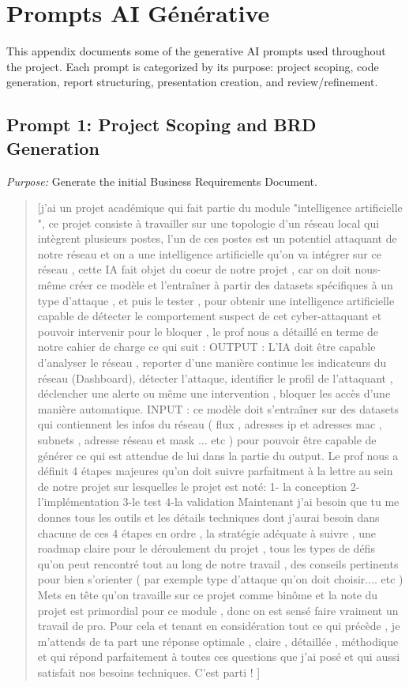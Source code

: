 \documentclass[12pt,a4paper]{report}
\begin{document}
\chapter{Prompts AI G\'{e}n\'{e}rative}

This appendix documents some of the generative AI prompts used throughout the project. Each prompt is categorized by its purpose: project scoping, code generation, report structuring, presentation creation, and review/refinement.

\section{Prompt 1: Project Scoping and BRD Generation}

\textit{Purpose:} Generate the initial Business Requirements Document.

\begin{quote}
\small
[j'ai un projet académique qui fait partie du module "intelligence artificielle ", ce projet consiste à travailler sur une topologie d'un réseau local qui intègrent plusieurs postes, l'un de ces postes est un potentiel attaquant de notre réseau et on a une intelligence artificielle qu'on va intégrer sur ce réseau , cette IA fait objet du coeur de notre projet , car on doit nous-même créer ce modèle et l'entraîner à partir des datasets spécifiques à un type d'attaque , et puis le tester , pour obtenir une intelligence artificielle capable de détecter le comportement suspect de cet cyber-attaquant et pouvoir intervenir pour le bloquer , le prof nous a détaillé en terme de notre cahier de charge ce qui suit : 
OUTPUT : L'IA doit être capable d'analyser le réseau , reporter d'une manière continue les indicateurs du réseau (Dashboard), détecter l'attaque, identifier le profil de l'attaquant , déclencher une alerte ou même une intervention , bloquer les accès d'une manière automatique. 
INPUT : ce modèle doit s'entraîner sur des datasets qui contiennent les infos du réseau ( flux , adresses ip et adresses mac , subnets , adresse réseau et mask ... etc ) pour pouvoir être capable de générer ce qui est attendue de lui dans la partie du output. Le prof nous a définit 4 étapes majeures qu'on doit suivre parfaitment à la lettre au sein de notre projet sur lesquelles le projet est noté: 
1- la conception 
2-l'implémentation 
3-le test 
4-la validation 
Maintenant j'ai besoin que tu me donnes tous les outils et les détails techniques dont j'aurai besoin dans chacune de ces 4 étapes en ordre , la stratégie adéquate à suivre , une roadmap claire pour le déroulement du projet , tous les types de défis qu'on peut rencontré tout au long de notre travail , des conseils pertinents pour bien s'orienter ( par exemple type d'attaque qu'on doit choisir.... etc ) 
Mets en tête qu'on travaille sur ce projet comme binôme et la note du projet est primordial pour ce module , donc on est sensé faire vraiment un travail de pro. Pour cela et tenant en considération tout ce qui précède , je m'attends de ta part une réponse optimale , claire , détaillée , méthodique et qui répond parfaitement à toutes ces questions que j'ai posé et qui aussi satisfait nos besoins techniques. 
C'est parti ! ]
\end{quote}
\end{document}
